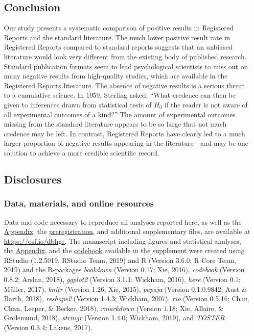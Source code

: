 \documentclass[british,,jou,floatsintext]{apa6}
\begin{document}
\hypertarget{conclusion}{%
\subsection{Conclusion}\label{conclusion}}

Our study presents a systematic comparison of positive results in Registered Reports and the standard literature. The much lower positive result rate in Registered Reports compared to standard reports suggests that an unbiased literature would look very different from the existing body of published research. Standard publication formats seem to lead psychological scientists to miss out on many negative results from high-quality studies, which are available in the Registered Reports literature. The absence of negative results is a serious threat to a cumulative science. In 1959, Sterling asked: \enquote{What credence can then be given to inferences drawn from statistical tests of \(H_0\) if the reader is not aware of all experimental outcomes of a kind?} The amount of experimental outcomes missing from the standard literature appears to be so large that not much credence may be left. In contrast, Registered Reports have clearly led to a much larger proportion of negative results appearing in the literature---and may be one solution to achieve a more credible scientific record.

\hypertarget{disclosures}{%
\subsection{Disclosures}\label{disclosures}}

\hypertarget{data-materials-and-online-resources}{%
\subsubsection{Data, materials, and online resources}\label{data-materials-and-online-resources}}

Data and code necessary to reproduce all analyses reported here, as well as the \href{https://osf.io/qw798/}{Appendix}, the \href{https://osf.io/sy927/}{preregistration}, and additional supplementary files, are available at \url{https://osf.io/dbhgr}. The manuscript including figures and statistical analyses, the \href{https://osf.io/qw798/}{Appendix}, and the \href{https://osf.io/6jrkz/}{codebook} available in the supplement were created using RStudio (1.2.5019, RStudio Team, 2019) and R (Version 3.6.0; R Core Team, 2019) and the R-packages \emph{bookdown} (Version 0.17; Xie, 2016), \emph{codebook} (Version 0.8.2; Arslan, 2018), \emph{ggplot2} (Version 3.1.1; Wickham, 2016), \emph{here} (Version 0.1; Müller, 2017), \emph{knitr} (Version 1.26; Xie, 2015), \emph{papaja} (Version 0.1.0.9842; Aust \& Barth, 2018), \emph{reshape2} (Version 1.4.3; Wickham, 2007), \emph{rio} (Version 0.5.16; Chan, Chan, Leeper, \& Becker, 2018), \emph{rmarkdown} (Version 1.18; Xie, Allaire, \& Grolemund, 2018), \emph{stringr} (Version 1.4.0; Wickham, 2019), and \emph{TOSTER} (Version 0.3.4; Lakens, 2017).
\end{document}
